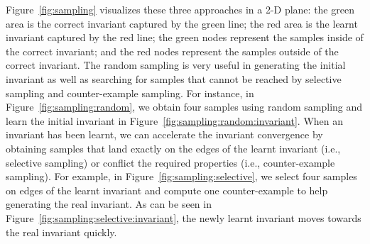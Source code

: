 Figure~\ref{fig:sampling} visualizes these three approaches in a 2-D plane: 
the green area is the correct invariant captured by the green line; 
the red area is the learnt invariant captured by the red line; 
the green nodes represent the samples inside of the correct invariant; 
and the red nodes represent the samples outside of the correct invariant. 
The random sampling is very useful in generating the initial invariant 
as well as searching for samples that cannot be reached 
by selective sampling and counter-example sampling. 
For instance, in Figure~\ref{fig:sampling:random}, 
we obtain four samples using random sampling 
and learn the initial invariant in Figure~\ref{fig:sampling:random:invariant}. 
When an invariant has been learnt, 
we can accelerate the invariant convergence by obtaining samples that 
land exactly on the edges of the learnt invariant (i.e., selective sampling) 
or conflict the required properties (i.e., counter-example sampling). 
For example, in Figure~\ref{fig:sampling:selective}, 
we select four samples on edges of the learnt invariant and 
compute one counter-example to help generating the real invariant. 
As can be seen in Figure~\ref{fig:sampling:selective:invariant}, 
the newly learnt invariant moves towards the real invariant quickly. 

